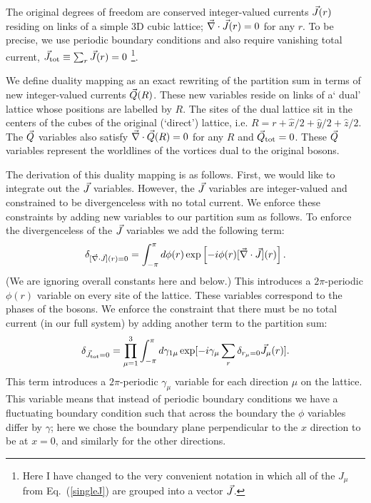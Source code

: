 The original degrees of freedom are conserved integer-valued currents $\vec{J}(r)$ residing on links of a simple 3D cubic lattice; $\vec{\nabla} \cdot \vec{J}(r) = 0$ for any $r$.  To be precise, we use periodic boundary conditions and also require vanishing total current, $\vec{J}_{\rm tot} \equiv \sum_r \vec{J}(r) = 0$
\footnote{Here I have changed to the very convenient notation in which all of the $J_\mu$ from Eq.~(\ref{singleJ}) are grouped into a vector $\vec{J}$.}.  

We define duality mapping as an exact rewriting of the partition sum in terms of new integer-valued currents $\vec{Q}(R)$. These new variables  reside on links of a` dual' lattice whose positions are labelled by $R$. The sites of the dual lattice sit in the centers of the cubes of the original (`direct') lattice, i.e. $R=r+\hat{x}/2+\hat{y}/2+\hat{z}/2$.
The $\vec{Q}$ variables also satisfy $\vec{\nabla} \cdot \vec{Q}(R) = 0$ for any $R$ and $\vec{Q}_{\rm tot} = 0$. These $\vec{Q}$ variables represent the worldlines of the vortices dual to the original bosons. 

The derivation of this duality mapping is as follows.  
 First, we would like to integrate out the $\vec{J}$ variables. However, the $\vec{J}$ variables are integer-valued and constrained to be divergenceless with no total current. We enforce these constraints by adding new variables to our partition sum as follows.
To enforce the divergenceless of the $\vec{J}$ variables we add the following term:
\begin{equation}
\delta_{[\vec{\nabla}\cdot\vec{J}](r)=0}=\int_{-\pi}^{\pi} d\phi(r) \exp\left[-i\phi(r)[\vec{\nabla}\cdot\vec{J}](r)\right].
\label{zphi}
\end{equation}
(We are ignoring overall constants here and below.) This introduces a $2\pi$-periodic $\phi(r)$ variable on every site of the lattice. These variables correspond to the phases of the bosons. We enforce the constraint that there must be no total current (in our full system) by adding another term to the partition sum:
\begin{eqnarray}
\delta_{\vec{J}_{{\rm tot}}=0}=\prod_{\mu=1}^{3}\int_{-\pi}^{\pi} d\gamma_{1\mu} \exp[-i\gamma_{\mu}\sum_r \delta_{r_\mu=0}\vec{J}_{\mu}(r)].
\label{zgamma}
\end{eqnarray}
This term introduces a $2\pi$-periodic $\gamma_{\mu}$ variable for each direction $\mu$ on the lattice. This variable means that instead of periodic boundary conditions we have a fluctuating boundary condition such that across the boundary the $\phi$ variables differ by $\gamma$; here we chose the boundary plane perpendicular to the $x$ direction to be at $x=0$, and similarly for the other directions.
 
